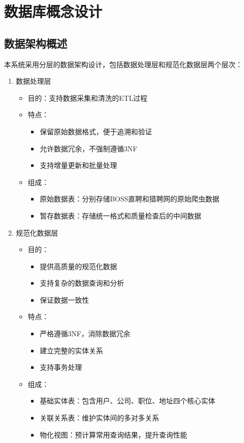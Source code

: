 \section{数据库概念设计}

\subsection{数据架构概述}

本系统采用分层的数据架构设计，包括数据处理层和规范化数据层两个层次：
\begin{enumerate}
  \item 数据处理层
  \begin{itemize}
    \item 目的：支持数据采集和清洗的ETL过程
    \item 特点：
    \begin{itemize}
      \item 保留原始数据格式，便于追溯和验证
      \item 允许数据冗余，不强制遵循3NF
      \item 支持增量更新和批量处理
    \end{itemize}
    \item 组成：
    \begin{itemize}
      \item 原始数据表：分别存储BOSS直聘和猎聘网的原始爬虫数据
      \item 暂存数据表：存储统一格式和质量检查后的中间数据
    \end{itemize}
  \end{itemize}

  \item 规范化数据层
  \begin{itemize}
    \item 目的：
    \begin{itemize}
      \item 提供高质量的规范化数据
      \item 支持复杂的数据查询和分析
      \item 保证数据一致性
    \end{itemize}
    \item 特点：
    \begin{itemize}
      \item 严格遵循3NF，消除数据冗余
      \item 建立完整的实体关系
      \item 支持事务处理
    \end{itemize}
    \item 组成：
    \begin{itemize}
      \item 基础实体表：包含用户、公司、职位、地址四个核心实体
      \item 关联关系表：维护实体间的多对多关系
      \item 物化视图：预计算常用查询结果，提升查询性能
    \end{itemize}
  \end{itemize}
\end{enumerate}

